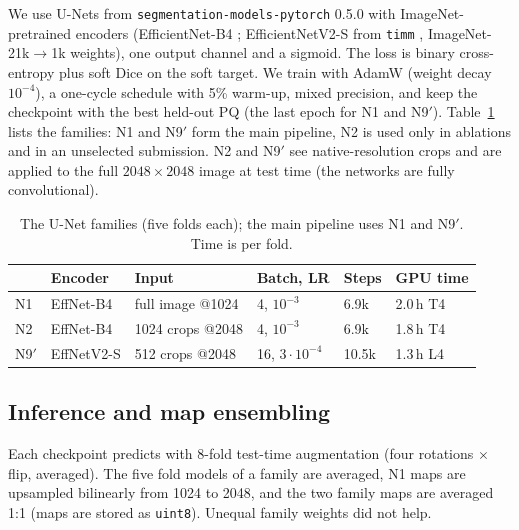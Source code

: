 \documentclass[sigconf]{acmart}
\begin{document}
We use U-Nets \cite{ronneberger2015unet} from \texttt{segmentation-models-pytorch} 0.5.0 \cite{iakubovskii2019smp} with ImageNet-pretrained encoders (EfficientNet-B4 \cite{tan2019efficientnet}; EfficientNetV2-S \cite{tan2021efficientnetv2} from \texttt{timm} \cite{wightman2019timm}, ImageNet-21k$\to$1k weights), one output channel and a sigmoid. The loss is binary cross-entropy plus soft Dice on the soft target. We train with AdamW (weight decay $10^{-4}$), a one-cycle schedule with 5\% warm-up, mixed precision, and keep the checkpoint with the best held-out PQ (the last epoch for N1 and N9$'$). Table~\ref{tab:families} lists the families: N1 and N9$'$ form the main pipeline, N2 is used only in ablations and in an unselected submission. N2 and N9$'$ see native-resolution crops and are applied to the full $2048\times2048$ image at test time (the networks are fully convolutional).

\begin{table}[t]
  \caption{The U-Net families (five folds each); the main pipeline uses N1 and N9$'$. Time is per fold.}
  \label{tab:families}
  \small
  \begin{tabular}{@{}llllll@{}}
    \toprule
    & Encoder & Input & Batch, LR & Steps & GPU time \\
    \midrule
    N1 & EffNet-B4 & full image @1024 & 4, $10^{-3}$ & 6.9k & 2.0\,h T4 \\
    N2 & EffNet-B4 & 1024 crops @2048 & 4, $10^{-3}$ & 6.9k & 1.8\,h T4 \\
    N9$'$ & EffNetV2-S & 512 crops @2048 & 16, $3\cdot10^{-4}$ & 10.5k & 1.3\,h L4 \\
    \bottomrule
  \end{tabular}
\end{table}

\subsection{Inference and map ensembling}
Each checkpoint predicts with 8-fold test-time augmentation (four rotations $\times$ flip, averaged). The five fold models of a family are averaged, N1 maps are upsampled bilinearly from 1024 to 2048, and the two family maps are averaged 1:1 (maps are stored as \texttt{uint8}). Unequal family weights did not help.
\end{document}
